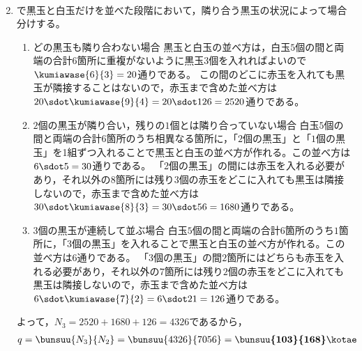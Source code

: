\documentclass[../../../doc/main]{subfiles}
\begin{document}
\begin{enumerate}
\begin{align*}
            \end{align*}
        \item [\kakkoni]
            \kakkoichi で黒玉と白玉だけを並べた段階において，隣り合う黒玉の状況によって場合分けする。
            \begin{enumerate}
                \item [\tokeiichi]
                    どの黒玉も隣り合わない場合
                    黒玉と白玉の並べ方は，白玉$ 5 $個の間と両端の合計$ 6 $箇所に重複がないように黒玉$ 3 $個を入れればよいので$ \kumiawase{6}{3} = 20 $通りである。
                    この間のどこに赤玉を入れても黒玉が隣接することはないので，赤玉まで含めた並べ方は$ 20 \sdot \kumiawase{9}{4} = 20 \sdot 126 = 2520 $通りである。
                \item [\tokeini]
                    $ 2 $個の黒玉が隣り合い，残りの$ 1 $個とは隣り合っていない場合
                    白玉$ 5 $個の間と両端の合計$ 6 $箇所のうち相異なる箇所に，「$ 2 $個の黒玉」と「$ 1 $個の黒玉」を1組ずつ入れることで黒玉と白玉の並べ方が作れる。この並べ方は$ 6 \sdot 5 = 30 $通りである。
                    「2個の黒玉」の間には赤玉を入れる必要があり，それ以外の$ 8 $箇所には残り$ 3 $個の赤玉をどこに入れても黒玉は隣接しないので，赤玉まで含めた並べ方は$ 30 \sdot \kumiawase{8}{3} = 30 \sdot 56 = 1680 $通りである。
                \item [\tokeisan]
                    $ 3 $個の黒玉が連続して並ぶ場合
                    白玉$ 5 $個の間と両端の合計$ 6 $箇所のうち$ 1 $箇所に，「3個の黒玉」を入れることで黒玉と白玉の並べ方が作れる。この並べ方は$ 6 $通りである。
                    「3個の黒玉」の間$ 2 $箇所にはどちらも赤玉を入れる必要があり，それ以外の$ 7 $箇所には残り$ 2 $個の赤玉をどこに入れても黒玉は隣接しないので，赤玉まで含めた並べ方は$ 6 \sdot \kumiawase{7}{2} = 6 \sdot 21 = 126 $通りである。
            \end{enumerate}
        よって，$ N_3 = 2520 + 1680 + 126 = 4326 $であるから，
        \begin{align*}
            q = \bunsuu{N_3}{N_2} = \bunsuu{4326}{7056} = \boldsymbol{\bunsuu{103}{168}} \kotae
        \end{align*}
    \end{enumerate}
\end{document}
